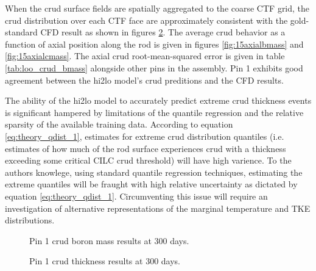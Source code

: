 When the crud surface fields are spatially aggregated to the coarse CTF grid, the crud distribution over each CTF face are approximately consistent with the gold-standard CFD result as shown in figures \ref{fig:dist_hi2loimppinzcthick}.  The average crud behavior as a function of axial position along the rod is given in figures \ref{fig:15axialbmass} and \ref{fig:15axialcmass}.  The axial crud root-mean-squared error is given in table \ref{tab:loo_crud_bmass} alongside other pins in the assembly.  Pin 1 exhibits good agreement between the hi2lo model's crud preditions and the CFD results.

The ability of the hi2lo model to accurately predict extreme crud thickness events is significant hampered by limitations of the quantile regression and the relative sparsity of the available training data.  According to equation \ref{eq:theory_qdist_1}, estimates for extreme crud distribution quantiles (i.e. estimates of how much of the rod surface experiences crud with a thickness exceeding some critical CILC crud threshold) will have high varience.  To the authors knowlege, using standard quantile regression techniques, estimating the extreme quantiles will be fraught with high relative uncertainty as dictated by equation \ref{eq:theory_qdist_1}.  Circumventing this issue will require an investigation of alternative representations of the marginal temperature and TKE distributions.

\begin{figure}[H]%
    \centering
    \qquad
    \caption{Pin 1 crud boron mass results at 300 days.}%
    \label{dist_fig:hi2loimppinzbmass}
\end{figure}


\begin{figure}[H]%
    \centering
    \qquad
    \caption{Pin 1 crud thickness results at 300 days.}%
    \label{fig:dist_hi2loimppinzcthick}
\end{figure}



